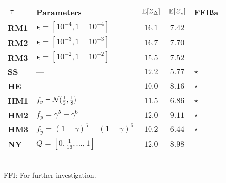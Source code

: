 \begin{tabular}{llccl}
	\toprule
      $\uptau$ & Parameters & $\mathbb{E}[\mathcal{Z}_{\Delta}]$ & $\mathbb{E} [\mathcal{Z}_{\star}]$ & FFI\ss{a} \\ \midrule
	\textbf{RM1} & $\bm{\epsilon} = [10^{-4},1-10^{-4}]$           &   $16.1$    &   $7.42$    &         \\
	\textbf{RM2} & $\bm{\epsilon} = [10^{-3},1-10^{-3}]$           &   $16.7$    &   $7.70$    &         \\
	\textbf{RM3} & $\bm{\epsilon} = [10^{-2},1-10^{-2}]$           &   $15.5$    &   $7.52$    &         \\
	\textbf{SS}  & ---                                             &   $12.2$    & $\bm{5.77}$ & $\star$ \\
	\textbf{HE}  & ---                                             & $\bm{10.0}$ &   $8.16$    & $\star$ \\
	\textbf{HM1} & $f_{\tilde{y}} = \mathcal{N}(\frac{1}{2},\frac{1}{8})$   &   $11.5$    &   $6.86$    & $\star$ \\
	\textbf{HM2} & $f_{\tilde{y}} = \gamma^5-\gamma^6$             &   $12.0$    &   $9.11$    & $\star$ \\
	\textbf{HM3} & $f_{\tilde{y}} = {(1-\gamma)}^5-{(1-\gamma)}^6$ & $\bm{10.2}$ & $\bm{6.44}$ & $\star$ \\
	\textbf{NY}  & $Q = [0,\frac{1}{16},\dots,1]$                  &   $12.0$    &   $8.98$    &         \\ \bottomrule
\end{tabular}\\[0.5em]
\footnotesize{FFI: For further investigation.}